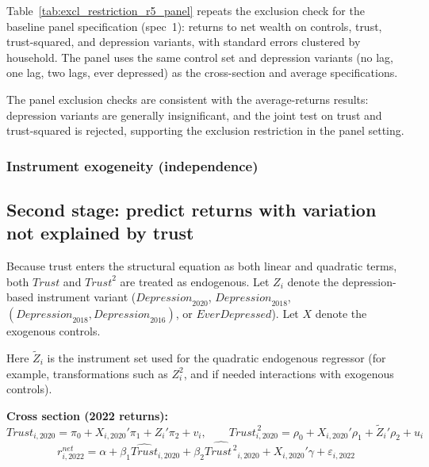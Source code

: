 \par Table~\ref{tab:excl_restriction_r5_panel} repeats the exclusion check for the baseline panel specification (spec~1): returns to net wealth on controls, trust, trust-squared, and depression variants, with standard errors clustered by household. The panel uses the same control set and depression variants (no lag, one lag, two lags, ever depressed) as the cross-section and average specifications.

\label{tab:excl_restriction_r5_panel}
\FloatBarrier

\par The panel exclusion checks are consistent with the average-returns results: depression variants are generally insignificant, and the joint test on trust and trust-squared is rejected, supporting the exclusion restriction in the panel setting.

\subsubsection{Instrument exogeneity (independence)}

\par

\subsection{Second stage: predict returns with variation not explained by trust}

\par Because trust enters the structural equation as both linear and quadratic terms, both \(\textit{Trust}\) and \(\textit{Trust}^2\) are treated as endogenous. Let \(Z_i\) denote the depression-based instrument variant (\(\textit{Depression}_{2020}\), \(\textit{Depression}_{2018}\), \((\textit{Depression}_{2018},\textit{Depression}_{2016})\), or \(\textit{EverDepressed}\)). Let \(X\) denote the exogenous controls. \par Here \(\tilde Z_i\) is the instrument set used for the quadratic endogenous regressor (for example, transformations such as \(Z_i^2\), and if needed interactions with exogenous controls).

\par \textbf{Cross section (2022 returns):}
\[
\textit{Trust}_{i,2020}=\pi_0+X_{i,2020}'\pi_1+Z_i'\pi_2+v_i,\qquad
\textit{Trust}_{i,2020}^{\,2}=\rho_0+X_{i,2020}'\rho_1+\tilde Z_i'\rho_2+u_i
\]
\[
r^{net}_{i,2022}=\alpha+\beta_1\widehat{\textit{Trust}}_{i,2020}+\beta_2\widehat{\textit{Trust}^{\,2}}_{i,2020}+X_{i,2020}'\gamma+\varepsilon_{i,2022}
\]

